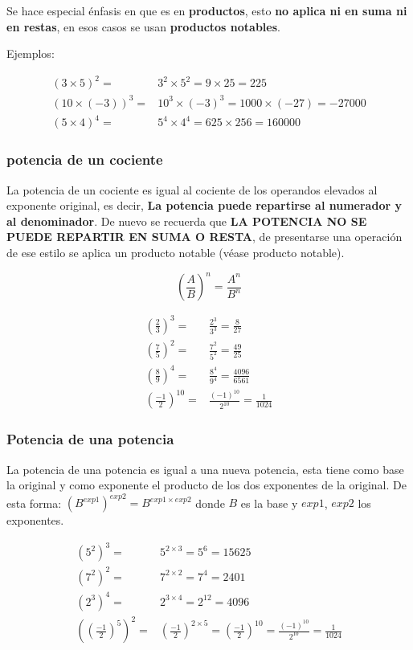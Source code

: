     Se hace especial énfasis en que es en \textbf{productos}, esto \textbf{no
    aplica ni en suma ni en restas}, en esos casos se usan \textbf{productos notables}.

    Ejemplos:

    \begin{align*}
        (3\times5)^2 =&3^2\times5^2= 9\times25=225		\\
        (10\times(-3))^3 =& 10^3 \times (-3)^3 = 1000\times(-27) = -27000\\
        (5\times4)^4 =&5^4\times4^4 = 625\times256= 160000
    \end{align*}



    \subsubsection*{potencia de un cociente}
    La potencia de un cociente es igual al cociente de los operandos elevados al
    exponente original, es decir, \textbf{La potencia puede repartirse al numerador
    y al denominador}. De nuevo se recuerda que \textbf{LA POTENCIA NO SE PUEDE
    REPARTIR EN SUMA O RESTA}, de presentarse una operación de ese estilo se
    aplica un producto notable (véase \refname{producto notable}).

    $$ \left(\frac{A}{B}\right)^{n} = \frac{A^n}{B^n}  $$

    \begin{align*}
       \left(\frac{2}{3}\right)^{3} =& \frac{2^3}{3^3}= \frac{8}{27}	\\
        \left(\frac{7}{5}\right)^{2} =& \frac{7^2}{5^2} =\frac{49}{25} \\
        \left(\frac{8}{9}\right)^{4} =&\frac{8^4}{9^4} = \frac{4096}{6561}\\
        \left(\frac{-1}{2}\right)^{10} =& \frac{(-1)^10}{2^10} = \frac{1}{1024}
    \end{align*}

    \subsubsection*{Potencia de una potencia}
    La potencia de una potencia es igual a una nueva potencia, esta tiene como base
    la original y como exponente el producto de los dos exponentes
    de la original. De esta forma: $(B^{exp1})^{exp2} = B^{exp1\times exp2}$
    donde $B$ es la base y $exp1$, $exp2$ los exponentes.

    \begin{align*}
        \left(5^2\right)^{3} =& 5^{2\times3}= 5^6 =15625	\\
        \left(7^2\right)^{2} =& 7^{2\times2}= 7^4  =2401 \\
        \left(2^3\right)^{4} =& 2^{3\times4}=2^12  = 4096\\
        \left(\left(\frac{-1}{2}\right)^{5}\right)^2 =&\left(\frac{-1}{2}\right)^{2\times5}= \left(\frac{-1}{2}\right)^{10}=\frac{(-1)^{10}}{2^{10}} = \frac{1}{1024}
    \end{align*}

